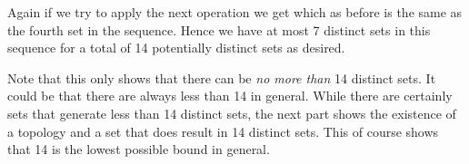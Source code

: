 {{    
    Again if we try to apply the next operation we get
    which as before is the same as the fourth set in the sequence.
    Hence we have at most 7 distinct sets in this sequence for a total of 14 potentially distinct sets as desired.
  }

  Note that this only shows that there can be \emph{no more than} 14 distinct sets.
  It could be that there are always less than 14 in general.
  While there are certainly sets that generate less than 14 distinct sets, the next part shows the existence of a topology and a set that does result in 14 distinct sets.
  This of course shows that 14 is the lowest possible bound in general.

}
